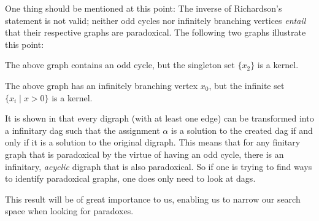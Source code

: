 One thing should be mentioned at this point:
The inverse of Richardson's statement is not valid; neither odd cycles nor infinitely branching vertices \textit{entail} that their respective graphs are paradoxical.
The following two graphs illustrate this point:\par
\begin{figure}[!h]
  \centering
  \caption{}
  \label{odd_cycle_with_kernel}
\end{figure}
The above graph contains an odd cycle, but the singleton set $\{x_2\}$ is a kernel.\par
\begin{figure}[!h]
  \centering
  \caption{}
  \label{infinitary_with_kernel}
\end{figure}
The above graph has an infinitely branching vertex $x_0$, but the infinite set $\{x_i \;|\; x > 0\}$ is a kernel.

It is shown in \cite{cook} that every digraph (with at least one edge) can be transformed into a infinitary dag such that the assignment $\alpha$ is a solution to the created dag if and only if it is a solution to the original digraph.
This means that for any finitary graph that is paradoxical by the virtue of having an odd cycle, there is an infinitary, \textit{acyclic} digraph that is also paradoxical.
So if one is trying to find ways to identify paradoxical graphs, one does only need to look at dags.

This result will be of great importance to us, enabling us to narrow our search space when looking for paradoxes.
